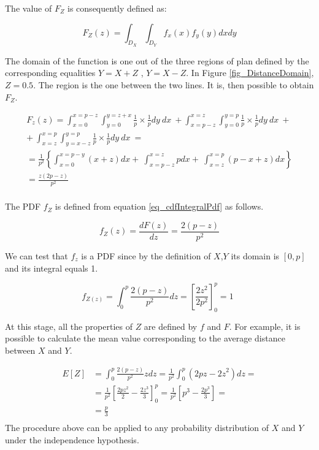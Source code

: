 The value of $F_Z$ is consequently defined as:

\begin{equation}
F_Z(z)=\int_{D_X}\int_{D_Y}{f_x\left(x\right)f_y(y)dxdy}
\label{eq_Distance4}
\end{equation}

The domain of the function is one out of the three regions of plan defined by the corresponding equalities $Y=X+Z$ , $Y=X-Z$. In Figure \ref{fig_DistanceDomain}, $Z=0.5$. The region is the one between the two lines. It is, then possible to obtain $F_Z$. 
\begin{center}
\begin{equation}
    \label{eq_Distance5}
    \begin{split}
    F_z\left(z\right) =\int_{x=0}^{x=p-z}{\int_{y=0}^{y=z+x}{\frac{1}{p}\times\frac{1}{p}dy\ dx\ }}  + \int_{x=p-z}^{x=z}\int_{y=0}^{y=p}{\frac{1}{p}\times\frac{1}{p}dy\ dx\ }+ \\
    +\ \int_{x=z}^{x=p}{\int_{y=x-z}^{y=p}{\frac{1}{p}\times\frac{1}{p}dy\ dx\ }=} \\
    =\frac{1}{p^2}\left\{\int_{x=0}^{x=p-y}\left(x+z\right)dx+\ \int_{x=p-z}^{x=z}pdx+\ \int_{x=z}^{x=p}\left(p-x+z\right)dx\right\} \\
    =\frac{z\left(2p-z\right)}{p^2} \\
    \end{split}
\end{equation}
\end{center}


The PDF $f_Z$ is defined from equation \ref{eq_cdfIntegralPdf} as follows.

\begin{equation}
f_Z(z)=\frac{dF(z)}{dz}=\frac{2\left(p-z\right)}{p^2}
\label{eq_Distance6}
\end{equation}

We can test that $f_z$ is a PDF since by the definition of $X$,$Y$ its domain is $[0,p]$ and its integral equals 1.

\begin{equation}
f_{Z\left(z\right)}=\int_{0}^{p}\frac{2\left(p-z\right)}{p^2}dz=\left[\frac{2z^2}{2p^2}\right]_0^p=1\ \ 
\label{eq_Distance7}
\end{equation}

At this stage, all the properties of $Z$ are defined by $f$ and $F$. For example, it is possible to calculate the mean value corresponding to the average distance between $X$ and $Y$. 

\begin{equation}
    \label{eq_Distance8}
    \begin{split}
    E\left[Z\right] & =\int_{0}^{p}\frac{2\left(p-z\right)}{p^2}zdz=\frac{1}{p^2}\int_{0}^{p}\left(2pz-{2z}^2\right)dz= \\
    & =\frac{1}{p^2}\left[\frac{2pz^2}{2}-\frac{{2z}^3}{3}\right]_0^p=\frac{1}{p^2}\left[p^3-\frac{2p^3}{3}\right]= \\
    & = \frac{p}{3} \\
    \end{split}
\end{equation}
The procedure above can be applied to any probability distribution of $X$ and $Y$ under the independence hypothesis.

